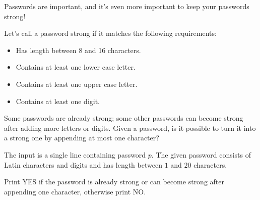 \problemname{\problemyamlname}


\newcommand{\minlen}{1}
\newcommand{\maxlen}{20}

Passwords are important, and it's even more important to keep your passwords strong!

Let's call a password strong if it matches the following requirements:
\begin{itemize}
\item Has length between 8 and 16 characters.
\item Contains at least one lower case letter.
\item Contains at least one upper case letter.
\item Contains at least one digit.
\end{itemize}

Some passwords are already strong; some other passwords can become strong after adding more letters or digits.
Given a password, is it possible to turn it into a strong one by appending at most one character?

\begin{Input}
    The input is a single line containing password $p$. The given password consists of Latin characters and digits and has length between $\minlen$ and $\maxlen$ characters.
\end{Input}

\begin{Output}
    Print YES if the password is already strong or can become strong after appending one character, otherwise print NO.
\end{Output}
